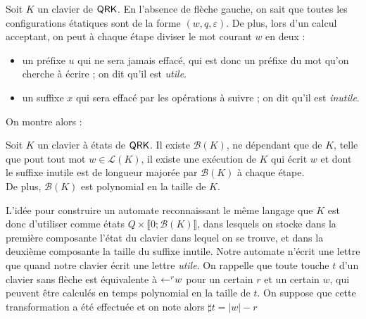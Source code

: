 \documentclass[12pt, a4paper]{article}
\renewcommand{\L}{\mathcal{L}}
\begin{document}
    Soit $K$ un clavier de $\mathsf{QRK}$. En l'absence de flèche gauche, on sait que toutes les configurations étatiques sont de la forme $(w,q,\varepsilon)$. De plus, lors d'un calcul acceptant, on peut à chaque étape diviser le mot courant $w$ en deux :
    \begin{itemize}
        \item un préfixe $u$ qui ne sera jamais effacé, qui est donc un préfixe du mot qu'on cherche à écrire ; on dit qu'il est \emph{utile}.
        \item un suffixe $x$ qui sera effacé par les opérations à suivre ; on dit qu'il est \emph{inutile}.
    \end{itemize}
    On montre alors :
    \begin{inutilesbornés}\label{bk}
        Soit $K$ un clavier à états de $\mathsf{QRK}$. Il existe $\mathcal{B}(K)$, ne dépendant que de $K$, telle que pout tout mot $w \in \L(K)$,
        il existe une exécution de $K$ qui écrit $w$ et dont le suffixe inutile est de longueur majorée par $\mathcal{B}(K)$ à chaque étape. \\
        De plus, $\mathcal{B}(K)$ est polynomial en la taille de $K$.
    \end{inutilesbornés}
    L'idée pour construire un automate reconnaissant le même langage que $K$ est donc d'utiliser comme états $Q \times \llbracket 0 ; \mathcal{B}(K) \rrbracket$, dans lesquels on stocke dans la première composante l'état du clavier dans lequel on se trouve,
    et dans la deuxième composante la taille du suffixe inutile. Notre automate n'écrit une lettre que quand notre clavier écrit une lettre \emph{utile}.
    On rappelle que toute touche $t$ d'un clavier sans flèche est équivalente à $\mathord{\leftarrow}^r w$ pour un certain $r$ et un certain $w$, qui peuvent être calculés en temps polynomial en la taille de $t$. On suppose que cette transformation a été effectuée et on note alors $\sharp t = |w| - r$
\end{document}
